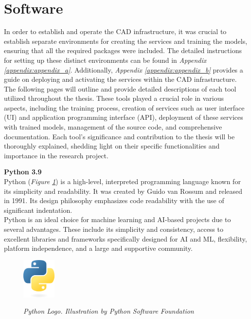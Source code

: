 \section{Software}

In order to establish and operate the CAD infrastructure, it was crucial to establish separate environments for creating the services and training the models, ensuring that all the required packages were included. The detailed instructions for setting up these distinct environments can be found in \textit{Appendix \ref{appendix:appendix_a}}. Additionally, \textit{Appendix \ref{appendix:appendix_b}} provides a guide on deploying and activating the services within the CAD infrastructure. \\

The following pages will outline and provide detailed descriptions of each tool utilized throughout the thesis. These tools played a crucial role in various aspects, including the training process, creation of services such as user interface (UI) and application programming interface (API), deployment of these services with trained models, management of the source code, and comprehensive documentation. Each tool's significance and contribution to the thesis will be thoroughly explained, shedding light on their specific functionalities and importance in the research project.

\newpage

\vspace{0.5cm}
\textbf{Python 3.9} \\

Python (\textit{Figure \ref{fig:python-logo}}) is a high-level, interpreted programming language known for its simplicity and readability. It was created by Guido van Rossum and released in 1991. Its design philosophy emphasizes code readability with the use of significant indentation. \\

Python is an ideal choice for machine learning and AI-based projects due to several advantages. These include its simplicity and consistency, access to excellent libraries and frameworks specifically designed for AI and ML, flexibility, platform independence, and a large and supportive community.

\begin{figure}[H]
\centering
\includegraphics[width=0.15\textwidth]{imatges/studies_and_decisions/python-logo-only.png}
\caption[Python Logo]{\textit{Python Logo. Illustration by Python Software Foundation}}
{\label{fig:python-logo}}
\end{figure}

